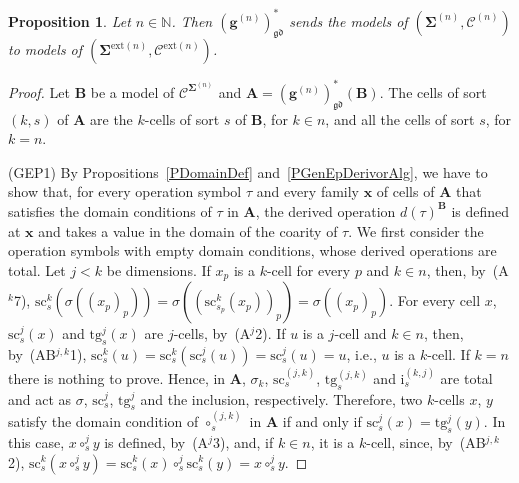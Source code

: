 \documentclass{amsart}
\theoremstyle{plain}
\newtheorem{proposition}[theorem]{Proposition}
\theoremstyle{definition}
\begin{document}
\begin{proposition}\label{PGradDerivor}
Let $n\in\mathbb{N}$. Then $(\mathbf{g}^{(n)})^{\ast}_{\mathfrak{gd}}$ sends the models of $(\mathbf{\Sigma}^{(n)},\mathcal{C}^{(n)})$ to models of $(\mathbf{\Sigma}^{\mathrm{ext}(n)},\mathcal{C}^{\mathrm{ext}(n)})$.
\end{proposition}
\begin{proof}
Let $\mathbf{B}$ be a model of $\boldsymbol{\mathcal{C}}^{\mathbf{\Sigma}^{(n)}}$ and $\mathbf{A}=(\mathbf{g}^{(n)})^{\ast}_{\mathfrak{gd}}(\mathbf{B})$. The cells of sort $(k,s)$ of $\mathbf{A}$ are the $k$-cells of sort $s$ of $\mathbf{B}$, for $k\in n$, and all the cells of sort $s$, for $k=n$.

(GEP1) By Propositions~\ref{PDomainDef} and~\ref{PGenEpDerivorAlg}, we have to show that, for every operation symbol $\tau$ and every family $\mathbf{x}$ of cells of $\mathbf{A}$ that satisfies the domain conditions of $\tau$ in $\mathbf{A}$, the derived operation $d(\tau)^{\mathbf{B}}$ is defined at $\mathbf{x}$ and takes a value in the domain of the coarity of $\tau$. We first consider the operation symbols with empty domain conditions, whose derived operations are total. Let $j<k$ be dimensions. If $x_{p}$ is a $k$-cell for every $p$ and $k\in n$, then, by~(A$^{k}$7), $\mathrm{sc}^{k}_{s}(\sigma((x_{p})_{p}))=\sigma((\mathrm{sc}^{k}_{s_{p}}(x_{p}))_{p})=\sigma((x_{p})_{p})$. For every cell $x$, $\mathrm{sc}^{j}_{s}(x)$ and $\mathrm{tg}^{j}_{s}(x)$ are $j$-cells, by~(A$^{j}$2). If $u$ is a $j$-cell and $k\in n$, then, by~(AB$^{j,k}$1), $\mathrm{sc}^{k}_{s}(u)=\mathrm{sc}^{k}_{s}(\mathrm{sc}^{j}_{s}(u))=\mathrm{sc}^{j}_{s}(u)=u$, i.e., $u$ is a $k$-cell. If $k=n$ there is nothing to prove. Hence, in $\mathbf{A}$, $\sigma_{k}$, $\mathrm{sc}^{(j,k)}_{s}$, $\mathrm{tg}^{(j,k)}_{s}$ and $\mathrm{i}^{(k,j)}_{s}$ are total and act as $\sigma$, $\mathrm{sc}^{j}_{s}$, $\mathrm{tg}^{j}_{s}$ and the inclusion, respectively. Therefore, two $k$-cells $x$, $y$ satisfy the domain condition of $\circ^{(j,k)}_{s}$ in $\mathbf{A}$ if and only if $\mathrm{sc}^{j}_{s}(x)=\mathrm{tg}^{j}_{s}(y)$. In this case, $x\circ^{j}_{s}y$ is defined, by~(A$^{j}$3), and, if $k\in n$, it is a $k$-cell, since, by~(AB$^{j,k}$2), $\mathrm{sc}^{k}_{s}(x\circ^{j}_{s}y)=\mathrm{sc}^{k}_{s}(x)\circ^{j}_{s}\mathrm{sc}^{k}_{s}(y)=x\circ^{j}_{s}y$.


\end{proof}
\end{document}
